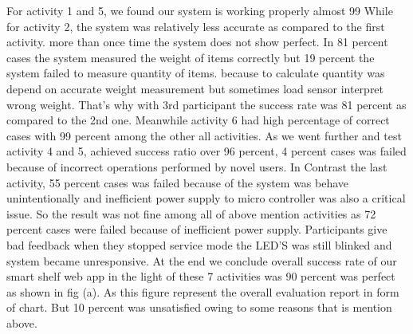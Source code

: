 For activity 1 and 5, we found our system is working properly almost 99%
While for activity 2, the system was relatively less accurate as compared to the first activity. more than once time the system does not show perfect. In 81 percent cases the system measured the weight of items correctly but 19 percent the system failed to measure quantity of items. because to calculate quantity was depend on accurate weight measurement but sometimes load sensor interpret wrong weight. That's why with 3rd participant the success rate was 81 percent as compared to the 2nd one. 
Meanwhile activity 6 had high percentage of correct cases with 99 percent among the other all activities.
As we went further and test activity 4 and 5, achieved success ratio over 96 percent, 4 percent cases was failed because of incorrect operations performed by novel users.
In Contrast the last activity, 55 percent cases was failed because of the system was behave unintentionally and inefficient power supply to micro controller was also a critical issue. So the result was not fine among all of above mention activities as 72 percent cases were failed because of inefficient power supply. Participants give bad feedback when they stopped service mode the LED'S was still blinked and system became unresponsive. 
At the end we conclude overall success rate of our smart shelf web app in the light of these 7 activities was 90 percent was perfect as shown in fig (a). As this figure represent the overall evaluation report in form of chart. But 10 percent was unsatisfied owing to some reasons that is mention above.

